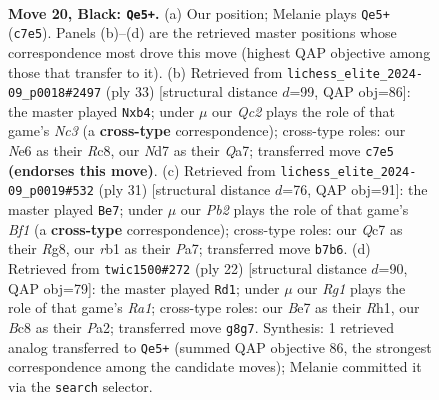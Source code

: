 \documentclass[11pt]{article}
\begin{document}
\begin{figure}[p]\centering
\begin{subfigure}{0.46\textwidth}\centering
\resizebox{\linewidth}{!}{%
\newchessgame
\chessboard[
  setfen={r1b2kr1/1pqnbp1p/p3n1p1/2Pp4/8/1NK1BPN1/PP4PP/1R1Q1B1R b - - 0 20},
  showmover=false,
  pgfstyle=straightmove, color=movearrow, markmove={c7-e5}
]}
\caption{}
\end{subfigure}\hfill
\begin{subfigure}{0.46\textwidth}\centering
\resizebox{\linewidth}{!}{%
\newchessgame
\chessboard[
  setfen={2r1k2r/q2bbppp/p1n1p3/3pP3/1P1P4/2NBPN2/1P4PP/R2Q1R1K b k - 0 17},
  showmover=false,
  pgfstyle=straightmove, color=movearrow, markmove={c6-b4}
]}
\caption{}
\end{subfigure}
\\[4pt]
\begin{subfigure}{0.46\textwidth}\centering
\resizebox{\linewidth}{!}{%
\newchessgame
\chessboard[
  setfen={r3kbr1/pp1b1p2/1qn1pn1p/8/2B2B2/5NNP/PPP1QPP1/R2R2K1 b q - 0 16},
  showmover=false,
  pgfstyle=straightmove, color=movearrow, markmove={f8-e7}
]}
\caption{}
\end{subfigure}\hfill
\begin{subfigure}{0.46\textwidth}\centering
\resizebox{\linewidth}{!}{%
\newchessgame
\chessboard[
  setfen={r1bqr1k1/pp3ppp/3b1n2/3p4/3Q4/1PN1P3/PB2BPPP/R3K2R w KQ - 1 12},
  showmover=false,
  pgfstyle=straightmove, color=movearrow, markmove={a1-d1}
]}
\caption{}
\end{subfigure}
\caption{\textbf{Move 20, Black: \texttt{Qe5+}.} (a) Our position; Melanie plays \texttt{Qe5+} (\texttt{c7e5}). Panels (b)--(d) are the retrieved master positions whose correspondence most drove this move (highest QAP objective among those that transfer to it). (b) Retrieved from \texttt{lichess\_elite\_2024-09\_p0018\#2497} (ply 33) [structural distance $d$=99, QAP obj=86]: the master played \texttt{Nxb4}; under $\mu$ our \emph{Qc2} plays the role of that game's \emph{Nc3} (a \textbf{cross-type} correspondence); cross-type roles: our \emph{N}e6 as their \emph{R}c8, our \emph{N}d7 as their \emph{Q}a7; transferred move \texttt{c7e5} \textbf{(endorses this move)}. (c) Retrieved from \texttt{lichess\_elite\_2024-09\_p0019\#532} (ply 31) [structural distance $d$=76, QAP obj=91]: the master played \texttt{Be7}; under $\mu$ our \emph{Pb2} plays the role of that game's \emph{Bf1} (a \textbf{cross-type} correspondence); cross-type roles: our \emph{Q}c7 as their \emph{R}g8, our \emph{r}b1 as their \emph{P}a7; transferred move \texttt{b7b6}. (d) Retrieved from \texttt{twic1500\#272} (ply 22) [structural distance $d$=90, QAP obj=79]: the master played \texttt{Rd1}; under $\mu$ our \emph{Rg1} plays the role of that game's \emph{Ra1}; cross-type roles: our \emph{B}e7 as their \emph{R}h1, our \emph{B}c8 as their \emph{P}a2; transferred move \texttt{g8g7}. Synthesis: 1 retrieved analog transferred to \texttt{Qe5+} (summed QAP objective 86, the strongest correspondence among the candidate moves); Melanie committed it via the \texttt{search} selector.}
\label{fig:thought-m39}
\end{figure}
\end{document}
